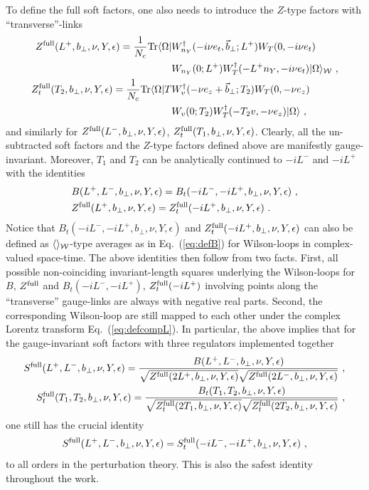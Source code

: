 \documentclass[a4paper,11pt]{article}
\begin{document}
To define the full soft factors, one also needs to introduce the $Z$-type factors with ``transverse''-links
\begin{align}
Z^{\rm full}(L^+,b_\perp,\nu,Y,\epsilon)=\frac{1}{N_c}{\rm Tr}\langle \Omega| &W_{n_Y}^{\dagger}(-i\nu e_t,\vec{b}_\perp;L^+)W_T(0,-i\nu e_t)
\nonumber \\ & W_{n_Y}(0;L^+)W_T^{\dagger}(-L^+n_Y,-i\nu e_t)|\Omega\rangle_{\cal W} \ , \\
Z_t^{\rm full}(T_2,b_\perp,\nu,Y,\epsilon)=\frac{1}{N_c}{\rm Tr}\langle \Omega| T&W^{\dagger}_{v}(-\nu e_z+\vec{b}_\perp;T_2)W_T(0,-\nu e_z)
\nonumber \\ & W_{v}(0;T_2)W_T^{\dagger}(-T_2v,-\nu e_z)|\Omega\rangle \ ,
\end{align}
and similarly for $Z^{\rm full}(L^-,b_\perp,\nu,Y,\epsilon)$, $Z_t^{\rm full}(T_1,b_\perp,\nu, Y,\epsilon)$. Clearly, all the un-subtracted soft factors and the $Z$-type factors defined above are manifestly gauge-invariant. Moreover, $T_1$ and $T_2$ can be analytically continued to $-iL^-$ and $-iL^+$ with the identities
\begin{align}
&B(L^+,L^-,b_\perp,\nu,Y,\epsilon)=B_t(-iL^-,-iL^+,b_\perp,\nu,Y,\epsilon) \ , \label{eq:fullfforB}\\
&Z^{\rm full}(L^+,b_\perp,\nu,Y,\epsilon)=Z_t^{\rm full}(-iL^+,b_\perp,\nu,Y,\epsilon) \label{eq:fullfforZ} \
 .
\end{align}
Notice that $B_t(-iL^-,-iL^+,b_\perp,\nu,Y,\epsilon)$ and $Z_t^{\rm full}(-iL^+,b_\perp,\nu,Y,\epsilon)$ can also be defined as $\langle \rangle_{\cal W}$-type averages as in Eq.~(\ref{eq:defB}) for Wilson-loops in complex-valued space-time. The above identities then follow from two facts. First,  all possible non-coinciding invariant-length squares underlying the Wilson-loops for $B$, $Z^{\rm full}$ and $B_t(-iL^-,-iL^+)$, $Z_t^{\rm full}(-iL^+)$ involving points along the ``transverse'' gauge-links are always with negative real parts. Second, the corresponding Wilson-loop are still mapped to each other under the complex Lorentz transform Eq.~(\ref{eq:defcompL}). In particular, the above implies that for the gauge-invariant soft factors with three regulators implemented together 
\begin{align}
S^{\rm full}(L^+,L^-,b_\perp,\nu,Y,\epsilon)=\frac{B(L^+,L^-,b_\perp,\nu,Y,\epsilon)}{\sqrt{Z^{\rm full}(2L^+,b_\perp,\nu,Y,\epsilon)}\sqrt{Z^{\rm full}(2L^-,b_\perp,\nu,Y,\epsilon)}} \ , \label{eq:Sfull}\\
S_t^{\rm full}(T_1,T_2,b_\perp,\nu,Y,\epsilon)=\frac{B_t(T_1,T_2,b_\perp,\nu,Y,\epsilon)}{\sqrt{Z_t^{{\rm full }}(2T_1,b_\perp,\nu,Y,\epsilon)}\sqrt{Z_t^{\rm full}(2T_2,b_\perp,\nu,Y,\epsilon)}} \ ,\label{eq:Stfull}
\end{align}
one still has the crucial identity
\begin{align}\label{eq:masterfull}
S^{\rm full}(L^+,L^-,b_\perp,\nu,Y,\epsilon)=S_t^{\rm full}(-iL^-,-iL^+,b_\perp,\nu,Y,\epsilon) \ ,
\end{align}
to all orders in the perturbation theory. This is also the safest identity throughout the work. 
\end{document}
